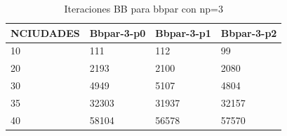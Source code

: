 \begin{table}[H]
\centering
\begin{tabular}{|l|l|l|l|}
\hline
\textbf{NCIUDADES} & \textbf{Bbpar-3-p0} & \textbf{Bbpar-3-p1} & \multicolumn{1}{c|}{\textbf{Bbpar-3-p2}} \\ \hline
10                 & 111                 & 112                 & 99                                       \\ \hline
20                 & 2193                & 2100                & 2080                                     \\ \hline
30                 & 4949                & 5107                & 4804                                     \\ \hline
35                 & 32303               & 31937               & 32157                                    \\ \hline
40                 & 58104               & 56578               & 57570                                    \\ \hline
\end{tabular}
\caption{Iteraciones BB para bbpar con np=3}
\end{table}